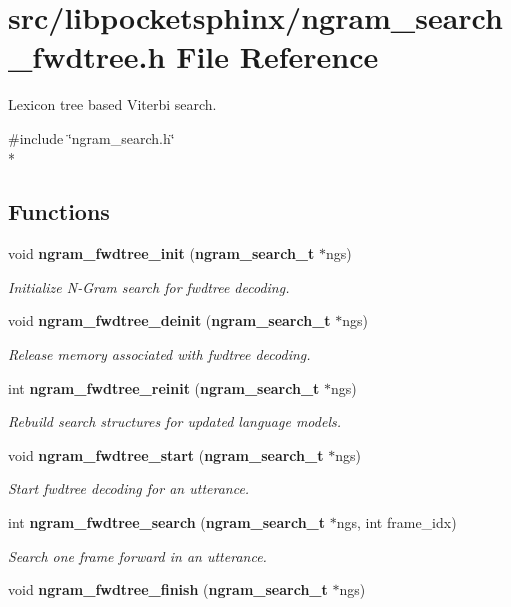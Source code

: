 \section{src/libpocketsphinx/ngram\+\_\+search\+\_\+fwdtree.h File Reference}
\label{ngram__search__fwdtree_8h}


Lexicon tree based Viterbi search.  


{\ttfamily \#include \char`\"{}ngram\+\_\+search.\+h\char`\"{}}\\*
\subsection*{Functions}
\begin{DoxyCompactItemize}
\item 
void {\bf ngram\+\_\+fwdtree\+\_\+init} ({\bf ngram\+\_\+search\+\_\+t} $\ast$ngs)\label{ngram__search__fwdtree_8h_a72c89a2a1f189495abee00e1853cddcc}

\begin{DoxyCompactList}\small\item\em Initialize N-\/\+Gram search for fwdtree decoding. \end{DoxyCompactList}\item 
void {\bf ngram\+\_\+fwdtree\+\_\+deinit} ({\bf ngram\+\_\+search\+\_\+t} $\ast$ngs)\label{ngram__search__fwdtree_8h_a0e0e0436b30e1074114e1d37991c5d6b}

\begin{DoxyCompactList}\small\item\em Release memory associated with fwdtree decoding. \end{DoxyCompactList}\item 
int {\bf ngram\+\_\+fwdtree\+\_\+reinit} ({\bf ngram\+\_\+search\+\_\+t} $\ast$ngs)\label{ngram__search__fwdtree_8h_aa53827b47025d4e7a63f3ddce763d84e}

\begin{DoxyCompactList}\small\item\em Rebuild search structures for updated language models. \end{DoxyCompactList}\item 
void {\bf ngram\+\_\+fwdtree\+\_\+start} ({\bf ngram\+\_\+search\+\_\+t} $\ast$ngs)\label{ngram__search__fwdtree_8h_af736200cd01a5d743dbab447ecc85d08}

\begin{DoxyCompactList}\small\item\em Start fwdtree decoding for an utterance. \end{DoxyCompactList}\item 
int {\bf ngram\+\_\+fwdtree\+\_\+search} ({\bf ngram\+\_\+search\+\_\+t} $\ast$ngs, int frame\+\_\+idx)
\begin{DoxyCompactList}\small\item\em Search one frame forward in an utterance. \end{DoxyCompactList}\item 
void {\bf ngram\+\_\+fwdtree\+\_\+finish} ({\bf ngram\+\_\+search\+\_\+t} $\ast$ngs)\label{ngram__search__fwdtree_8h_af32a83dbb9187542577a0c500b000840}


\end{DoxyCompactItemize}
